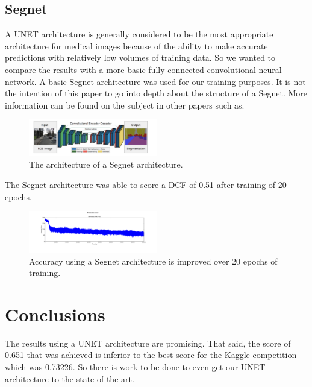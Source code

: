 \documentclass[letterpaper]{article}
\begin{document}
\subsection{Segnet}
A UNET architecture is generally considered to be the most appropriate architecture for medical images because of the ability to make accurate predictions with relatively low volumes of training data. So we wanted to compare the results with a more basic fully connected convolutional neural network. A basic Segnet architecture was used for our training purposes. It is not the intention of this paper to go into depth about the structure of a Segnet. More information can be found on the subject in other papers such as. 

 \begin{figure}[H]
  \centerline{\includegraphics[width=0.5\textwidth]{Images/SegNetArchitecture.png}}
  \caption{The architecture of a Segnet architecture.}
  \label{fig:segnet}
\end{figure}


The Segnet architecture was able to score a DCF of 0.51 after training of 20 epochs. 


 \begin{figure}[H]
  \centerline{\includegraphics[width=0.5\textwidth]{Plots/AverageErrorKullEvery5000.png}}
  \caption{Accuracy using a Segnet architecture is improved over 20 epochs of training.}
  \label{fig:trainingovertime2.}
\end{figure}


\section{Conclusions}
The results using a UNET architecture are promising. That said, the score of 0.651 that was achieved is inferior to the best score for the Kaggle competition which was 0.73226. So there is work to be done to even get our UNET architecture to the state of the art. 
\end{document}

